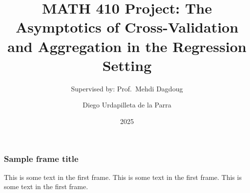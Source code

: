 \documentclass{beamer}
\title[CV for Selection and Aggregation]{MATH 410 Project: The Asymptotics of Cross-Validation and Aggregation in the Regression Setting}
\author[Diego Urdapilleta]{Diego Urdapilleta de la Parra}
\subtitle{Supervised by: Prof.\ Mehdi Dagdoug}
\institute[McGill]{McGill University}
\date{2025}
\begin{document}
\frame{\titlepage}

\begin{frame}
\frametitle{Sample frame title}
This is some text in the first frame. This is some text in the first frame. This is some text in the first frame.
\end{frame}
\end{document}
